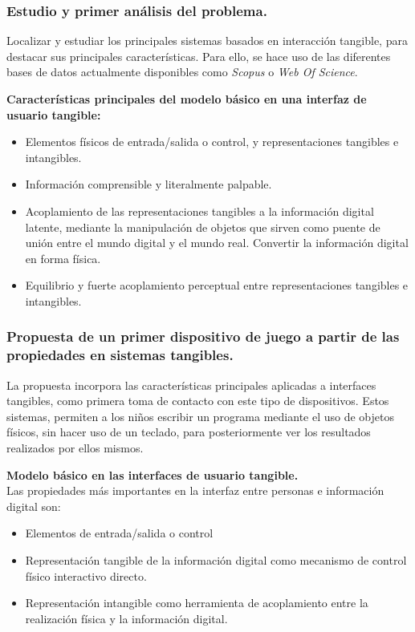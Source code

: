 \subsubsection{Estudio y primer análisis del problema.}
Localizar y estudiar los principales sistemas basados en interacción tangible, para destacar sus principales características. Para ello, se hace uso de las diferentes bases de datos actualmente disponibles como \emph{Scopus} o \emph{Web Of Science}.

\textbf{Características principales del modelo básico en una interfaz de usuario tangible:}\\
\begin{itemize}
\item Elementos físicos de entrada/salida o control, y representaciones tangibles e intangibles.
\item Información comprensible y literalmente palpable.
\item Acoplamiento de las representaciones tangibles a la información digital latente, mediante la manipulación de objetos que sirven como puente de unión entre el mundo digital y el mundo real. Convertir la información digital en forma física.
\item Equilibrio y fuerte acoplamiento perceptual entre representaciones tangibles e intangibles.
\end{itemize}

\subsubsection{Propuesta de un primer dispositivo de juego a partir de las propiedades en sistemas tangibles.}
La propuesta incorpora las características principales aplicadas a interfaces tangibles, como primera toma de contacto con este tipo de dispositivos.
Estos sistemas, permiten a los niños escribir un programa mediante el uso de objetos físicos, sin hacer uso de un teclado, para posteriormente ver los resultados realizados por ellos mismos.

\textbf{Modelo básico en las interfaces de usuario tangible.}\\
Las propiedades más importantes en la interfaz entre personas e información digital son:
\begin{itemize}	
\item Elementos de entrada/salida o control
\item Representación tangible de la información digital como mecanismo de control físico interactivo directo. 
\item Representación intangible como herramienta de acoplamiento entre la realización física y la información digital.
\end{itemize}

